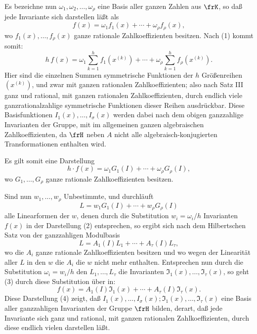 \documentclass[11pt]{article}
\begin{document}
Es bezeichne nun \(\omega_1,\omega_2,\ldots,\omega_\rho\) eine Basis aller ganzen Zahlen aus \(\frK\), so daß jede Invariante sich darstellen läßt als
\[
        f(x)=\omega_1 f_1(x)+\cdots+\omega_\rho f_\rho(x),
\]
wo \(f_1(x),\ldots,f_\rho(x)\) ganze rationale Zahlkoeffizienten besitzen. Nach (1) kommt somit:
\[
        h\,f(x)
        =
        \omega_1\sum_{k=1}^{h}f_1(x^{(k)})
        +\cdots+
        \omega_\rho\sum_{k=1}^{h}f_\rho(x^{(k)}).
\]
Hier sind die einzelnen Summen symmetrische Funktionen der \(h\) Größenreihen \((x^{(k)})\), und zwar mit ganzen rationalen Zahlkoeffizienten; also nach Satz III ganz und rational, mit ganzen rationalen Zahlkoeffizienten, durch endlich viele ganzrationalzahlige symmetrische Funktionen dieser Reihen ausdrückbar. Diese Basisfunktionen \(I_1(x),\ldots,I_\sigma(x)\) werden dabei nach dem obigen ganzzahlige Invarianten der Gruppe, mit im allgemeinen ganzen algebraischen Zahlkoeffizienten, da \(\frH\) neben \(A\) nicht alle algebraisch-konjugierten Transformationen enthalten wird.

Es gilt somit eine Darstellung
\begin{equation}
        h\cdot f(x)=\omega_1G_1(I)+\cdots+\omega_\rho G_\rho(I),
\end{equation}
wo \(G_1,\ldots,G_\rho\) ganze rationale Zahlkoeffizienten besitzen.

Sind nun \(w_1,\ldots,w_\rho\) Unbestimmte, und durchläuft
\[
        L=w_1G_1(I)+\cdots+w_\rho G_\rho(I)
\]
alle Linearformen der \(w\), denen durch die Substitution \(w_i=\omega_i/h\) Invarianten \(f(x)\) in der Darstellung (2) entsprechen, so ergibt sich nach dem Hilbertschen Satz von der ganzzahligen Modulbasis
\begin{equation}
        L=A_1(I)L_1+\cdots+A_\tau(I)L_\tau,
\end{equation}
wo die \(A_i\) ganze rationale Zahlkoeffizienten besitzen und wo wegen der Linearität aller \(L\) in den \(w\) die \(A_i\) die \(w\) nicht mehr enthalten. Entsprechen nun durch die Substitution \(\omega_i=w_i/h\) den \(L_1,\ldots,L_\tau\) die Invarianten \(\mathfrak I_1(x),\ldots,\mathfrak I_\tau(x)\), so geht (3) durch diese Substitution über in:
\begin{equation}
        f(x)=A_1(I)\mathfrak I_1(x)+\cdots+A_\tau(I)\mathfrak I_\tau(x).
\end{equation}
Diese Darstellung (4) zeigt, daß \(I_1(x),\ldots,I_\sigma(x);\mathfrak I_1(x),\ldots,\mathfrak I_\tau(x)\) eine Basis aller ganzzahligen Invarianten der Gruppe \(\frH\) bilden, derart, daß jede Invariante sich ganz und rational, mit ganzen rationalen Zahlkoeffizienten, durch diese endlich vielen darstellen läßt.
\end{document}
